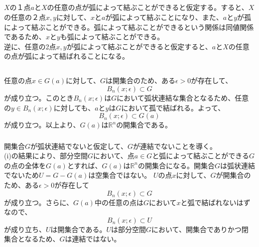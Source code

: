 \documentclass{jsarticle}
\begin{document}
\subsection{}

$X$の１点$a$と$X$の任意の点が弧によって結ぶことができると仮定する。すると、$X$の任意の２点$x,y$に対して、$x$と$a$が弧によって結ぶことになり、また、$a$と$y$が孤によって結ぶことができる。弧によって結ぶことができるという関係は同値関係であるため、$x$と$y$も弧によって結ぶことができる。\\
逆に、任意の2点$x,y$が弧によって結ぶことができると仮定すると、$a$と$X$の任意の点が弧によって結ばれることになる。


\subsection{}
\subsubsection{}
任意の点$x\in G(a)$に対して、$G$は開集合のため、ある$\epsilon>0$が存在して、
\[B_n(x;\epsilon)\subset G\]
が成り立つ。このとき$B_n(x;\epsilon)$は$G$において弧状連結な集合となるため、任意の$y\in B_n(x;\epsilon)$に対しても、$a$と$y$は$G$において孤で結ばれる。よって、
\[B_n(x;\epsilon)\subset G(a)\]
が成り立つ。以上より、$G(a)$は$\mathbb{R}^n$の開集合である。
\subsubsection{}
開集合$G$が弧状連結でないと仮定して、$G$が連結でないことを導く。\\
(i)の結果により、部分空間$G$において、点$a\in G$と弧によって結ぶことができる$G$の点の全体を$G(a)$とすれば、$G(a)$は$\mathbb{R}^n$の開集合になる。開集合$G$は弧状連結でないため$U=G-G(a) $は空集合ではない。
$U$の点$x$に対して、$G$が開集合のため、ある$\epsilon>0$が存在して
\[B_n(x;\epsilon)\subset G\]
が成り立つ。さらに、$G(a)$中の任意の点は$G$において$x$と弧で結ばれないはずなので、
\[B_n(x;\epsilon)\subset U\]
が成り立ち、$U$は開集合である。$U$は部分空間$G$において、開集合でありかつ閉集合となるため、$G$は連結ではない。
\end{document}
